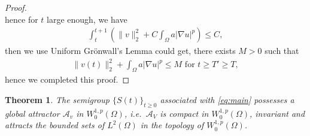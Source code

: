 \documentclass[11pt]{amsart}
\newtheorem{theorem}{Theorem}[section]
\theoremstyle{definition}
\numberwithin{equation}{section}
\newcommand*\abs[1]{\lvert#1\rvert}
\newcommand*\norm[1]{\lVert#1\rVert}
\newcommand*\Brace[1]{\lbrace#1\rbrace}
\begin{document}
\begin{proof}
\begin{equation}
	\end{equation}
	hence for $t$ large enough, we have
	\begin{equation}
		\begin{split}
			\int_t^{t+1}\left(
			\norm{v}_2^2 + C\int_{\Omega}a\abs{\nabla u}^p
			\right) \leq C,
		\end{split}
	\end{equation}
	then we use Uniform Gr\"onwall's Lemma could get, there exists $M > 0$ such that
	\begin{equation}
		\begin{split}
			\norm{v(t)}_2^2
			+ \int_{\Omega}a\abs{\nabla u}^p \leq M \text{ for } t \geq T' \geq T,
		\end{split}
	\end{equation}
	hence we completed this proof.
\end{proof}
\begin{theorem}
	The semigroup $\Brace{S(t)}_{t \geq 0}$ associated with \cref{eq:main} possesses
	a global attractor $\mathcal{A}_v$ in $W_0^{1,p}(\Omega)$, i.e.\
	$\mathcal{A}_V$ is compact in $W_0^{1,p}(\Omega)$, invariant and attracts the
	bounded sets of $L^2(\Omega)$ in the topology of $W_0^{1,p}(\Omega)$.
\end{theorem}
\end{document}
